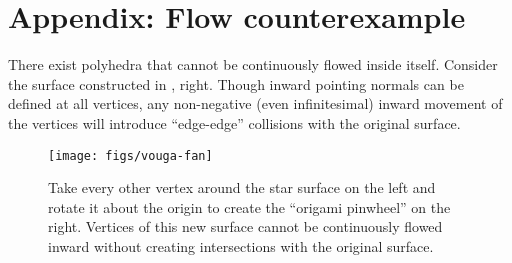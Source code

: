 \section*{Appendix: Flow counterexample}
%
\label{app:counterexample}
%
There exist polyhedra that cannot be continuously flowed inside itself.
%
Consider the surface constructed in , right. Though inward
pointing normals can be defined at all vertices, any non-negative (even
infinitesimal) inward movement of the vertices will introduce ``edge-edge''
collisions with the original surface.
%
\begin{figure}
\texttt{[image: figs/vouga-fan]}
\caption{Take every other vertex around the star surface on the left and
rotate it about the origin to create the ``origami pinwheel'' on the right.
Vertices of this new surface cannot be continuously flowed inward without
creating intersections with the original surface.}
\label{fig:vouga-fan}
\end{figure}
